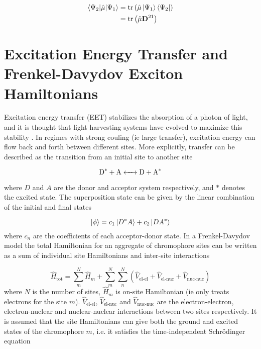 \begin{equation}
\begin{split}    
\braket{\Psi_2|\hat{\mathbf{\mu}}|\Psi_1} &= \text{tr}\left(\hat{\mathbf{\mu}} \ket{\Psi_1} \bra{\Psi_2} \right) \\
&= \text{tr}\left( \hat{\mathbf{\mu}} \mathbf{D}^{21}\right)
\end{split}
\end{equation}
%
\section{Excitation Energy Transfer and Frenkel-Davydov Exciton Hamiltonians}
\label{sec:frenkel_exciton_theory}

Excitation energy transfer (EET) stabilizes the absorption of a photon of light,
and it is thought that light harvesting systems have evolved to maximize this stability \cite{Cleary2013}.
In regimes with strong couling (ie large transfer), excitation energy can flow back
and forth between different sites. More explicitly, transfer can be described as
the transition from an initial site to another site

\begin{equation}
\ce{D^* + A <-> D + A^*}
\end{equation}

where $D$ and $A$ are the donor and acceptor system respectively, and $*$ denotes
the excited state. The superposition state can be given by the linear combination 
of the initial and final states

\begin{equation}
\ket{\phi} = c_1 \ket{D^*A} + c_2 \ket{DA^*}
\end{equation}
%
where $c_n$ are the coefficients of each acceptor-donor state. In a Frenkel-Davydov \cite{Frenkel1931, Davydov1964}
model the total Hamiltonian for an aggregate of chromophore sites can be written
as a sum of individual site Hamiltonians and inter-site interactions

\begin{equation}
\hat{H}_{\text{tot}} = \sum^N_m \hat{H}_m + \sum^N_m \sum^N_n \left(\hat{V}_{\text{el-el}} + \hat{V}_{\text{el-nuc}} + \hat{V}_{\text{nuc-nuc}}\right)
\end{equation}
%
where $N$ is the number of sites, $\hat{H}_m$ is on-site Hamiltonian (ie only treats
electrons for the site $m$). $\hat{V}_{\text{el-el}}$, $\hat{V}_{\text{el-nuc}}$ 
and $\hat{V}_{\text{nuc-nuc}}$ are the electron-electron, electron-nuclear and nuclear-nuclear
interactions between two sites respectively. It is assumed that the site Hamiltonians
can give both the ground and excited states of the chromophore $m$, i.e. it satisfies
the time-independent Schrödinger equation

